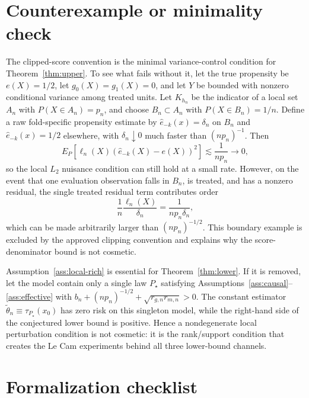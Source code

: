 \documentclass[11pt]{article}
\theoremstyle{definition}
\theoremstyle{plain}
\theoremstyle{remark}
\begin{document}
\section{Counterexample or minimality check}
The clipped-score convention is the minimal variance-control condition for Theorem~\ref{thm:upper}. To see
what fails without it, let the true propensity be $e(X)=1/2$, let $g_0(X)=g_1(X)=0$, and let $Y$ be
bounded with nonzero conditional variance among treated units. Let $K_{h_n}$ be the indicator of a
local set $A_n$ with $P(X\in A_n)=p_n$, and choose $B_n\subset A_n$ with $P(X\in B_n)=1/n$. Define a
raw fold-specific propensity estimate by $\hat e_{-k}(x)=\delta_n$ on $B_n$ and
$\hat e_{-k}(x)=1/2$ elsewhere, with $\delta_n\downarrow0$ much faster than $(n p_n)^{-1}$.
Then
\[
  E_P[\ell_n(X)(\hat e_{-k}(X)-e(X))^2]\lesssim \frac{1}{n p_n}\to0,
\]
so the local $L_2$ nuisance condition can still hold at a small rate. However, on the event that one
evaluation observation falls in $B_n$, is treated, and has a nonzero residual, the single treated
residual term contributes order
\[
  \frac{1}{n}\frac{\ell_n(X)}{\delta_n}
  =
  \frac{1}{n p_n\delta_n},
\]
which can be made arbitrarily larger than $(n p_n)^{-1/2}$. This boundary example is excluded by the
approved clipping convention and explains why the score-denominator bound is not cosmetic.

Assumption~\ref{ass:local-rich} is essential for Theorem~\ref{thm:lower}. If it is removed, let the model contain only a single law $P_\star$ satisfying Assumptions~\ref{ass:causal}--\ref{ass:effective} with $b_n+(n p_n)^{-1/2}+\sqrt{r_{g,n}r_{m,n}}>0$. The constant estimator $\tilde\theta_n\equiv\tau_{P_\star}(x_0)$ has zero risk on this singleton model, while the right-hand side of the conjectured lower bound is positive. Hence a nondegenerate local perturbation condition is not cosmetic: it is the rank/support condition that creates the Le Cam experiments behind all three lower-bound channels.

\section{Formalization checklist}
\end{document}
